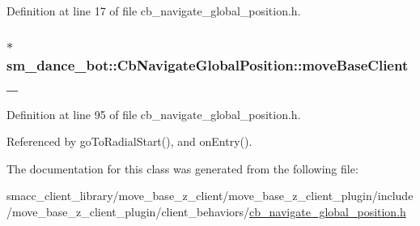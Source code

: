 Definition at line 17 of file cb\+\_\+navigate\+\_\+global\+\_\+position.\+h.

\subsubsection[{\texorpdfstring{move\+Base\+Client\+\_\+}{moveBaseClient_}}]{$\ast$ sm\+\_\+dance\+\_\+bot\+::\+Cb\+Navigate\+Global\+Position\+::move\+Base\+Client\+\_\+\hspace{0.3cm}{\ttfamily [private]}}\hypertarget{classsm__dance__bot_1_1CbNavigateGlobalPosition_a1d94ab79bdffa994748287c09bd8c18e}{}\label{classsm__dance__bot_1_1CbNavigateGlobalPosition_a1d94ab79bdffa994748287c09bd8c18e}


Definition at line 95 of file cb\+\_\+navigate\+\_\+global\+\_\+position.\+h.



Referenced by go\+To\+Radial\+Start(), and on\+Entry().



The documentation for this class was generated from the following file\+:\begin{DoxyCompactItemize}
\item 
smacc\+\_\+client\+\_\+library/move\+\_\+base\+\_\+z\+\_\+client/move\+\_\+base\+\_\+z\+\_\+client\+\_\+plugin/include/move\+\_\+base\+\_\+z\+\_\+client\+\_\+plugin/client\+\_\+behaviors/\hyperlink{smacc__client__library_2move__base__z__client_2move__base__z__client__plugin_2include_2move__base314f1b987667b08527fd8e96cdcf0a7}{cb\+\_\+navigate\+\_\+global\+\_\+position.\+h}\end{DoxyCompactItemize}
